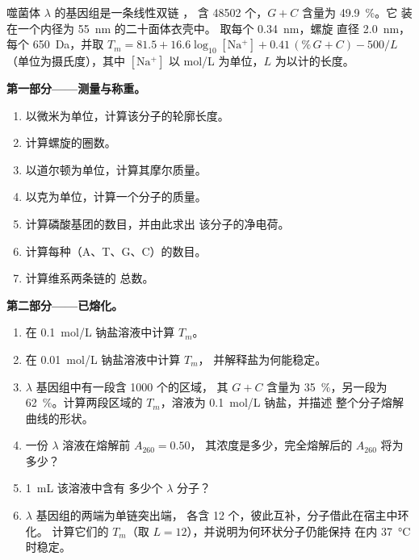 \begin{problem}
\label{pb:b1:nucleic-acids:1}
噬菌体 $\lambda$ 的基因组是一条线性双链 ，
含 \num{48502} 个，$G + C$ 含量为 \qty{49.9}{\%}。它
装在一个内径为 \qty{55}{nm} 的二十面体衣壳中。
取每个 \qty{0.34}{nm}，螺旋
直径 \qty{2.0}{nm}，每个 \qty{650}{Da}，并取 $T_m = 81.5 + 16.6\log_{10}[\mathrm{Na^+}]
+ 0.41\,(\%\,G{+}C) - 500/L$（单位为摄氏度），其中 $[\mathrm{Na^+}]$
以 \unit{mol/L} 为单位，$L$ 为以计的长度。

\medskip
\noindent\textbf{第一部分——测量与称重。}
\begin{enumerate}
  \item 以微米为单位，计算该分子的轮廓长度。
  \item 计算螺旋的圈数。
  \item 以道尔顿为单位，计算其摩尔质量。
  \item 以克为单位，计算一个分子的质量。
  \item 计算磷酸基团的数目，并由此求出
        该分子的净电荷。
  \item 计算每种（A、T、G、C）的数目。
  \item 计算维系两条链的
        总数。
\end{enumerate}

\medskip
\noindent\textbf{第二部分——已熔化。}
\begin{enumerate}[resume]
  \item 在 \qty{0.1}{mol/L} 钠盐溶液中计算 $T_m$。
  \item 在 \qty{0.01}{mol/L} 钠盐溶液中计算 $T_m$，
        并解释盐为何能稳定。
  \item $\lambda$ 基因组中有一段含 \qty{1000}{} 个的区域，
        其 $G + C$ 含量为 \qty{35}{\%}，另一段为 \qty{62}{\%}。计算两段区域的
        $T_m$，溶液为 \qty{0.1}{mol/L} 钠盐，并描述
        整个分子熔解曲线的形状。
  \item 一份 $\lambda$  溶液在熔解前 $A_{260} = 0.50$，
        其浓度是多少，完全熔解后的 $A_{260}$
        将为多少？
  \item \qty{1}{mL} 该溶液中含有
        多少个 $\lambda$ 分子？
  \item $\lambda$ 基因组的两端为单链突出端，
        各含 12 个，彼此互补，分子借此在宿主中环化。
        计算它们的
        $T_m$（取 $L = 12$），并说明为何环状分子仍能保持
        在内 \qty{37}{\celsius} 时稳定。
\end{enumerate}


\end{problem}

